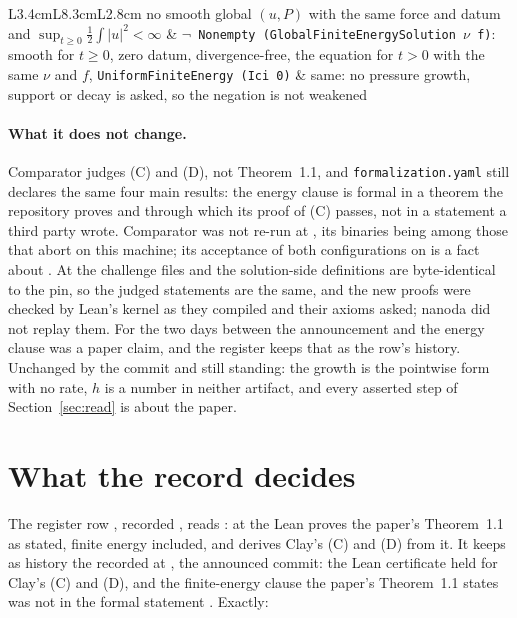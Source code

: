\documentclass[11pt]{article}
\newcommand{\lean}[1]{\texttt{#1}}
\begin{document}
\begin{table}[t]
\begin{tabular}{L{3.4cm}L{8.3cm}L{2.8cm}}
no smooth global $(u,P)$ with the same force and datum and $\sup_{t\ge0}\tfrac12\int|u|^2<\infty$ & \lean{$\neg$ Nonempty (GlobalFiniteEnergySolution $\nu$ f)}: smooth for $t\ge0$, zero datum, divergence-free, the equation for $t>0$ with the same $\nu$ and $f$, \lean{UniformFiniteEnergy (Ici 0)} & same: no pressure growth, support or decay is asked, so the negation is not weakened \\
\bottomrule\end{tabular}
\caption{The paper's Theorem~1.1 against \lean{breakdownStatement}, the statement
\lean{theorem\_1\_1} proves at \lean{\UpCommit}, one row per clause (\UpFidRows{} rows;
\UpFidSame{} read \emph{same}, \UpFidEquivalent{} \emph{equivalent}). Transcribed from the
record \cite{Records}.}\label{tab:thm11}
\end{table}

{\sloppy\paragraph{What it does not change.} Comparator judges (C) and (D), not Theorem~1.1, and
\lean{formalization.yaml} still declares the same four main results: the energy clause is
formal in a theorem the repository proves and through which its proof of (C) passes, not in a
statement a third party wrote. Comparator was not re-run at \lean{\UpCommit}, its binaries
being among those that abort on this machine; its acceptance of both configurations on
\BuildDate{} is a fact about \lean{\LeanCommit}. At \lean{\UpCommit} the challenge files and
the solution-side definitions are byte-identical to the pin, so the judged statements are the
same, and the new proofs were checked by Lean's kernel as they compiled and their axioms
asked; nanoda did not replay them. For the two days between the announcement and
\lean{\UpCommit} the energy clause was a paper claim, and the register keeps that as the row's
history. Unchanged by the commit and still standing: the growth is the pointwise form with no
rate, $h$ is a number in neither artifact, and every asserted step of Section~\ref{sec:read}
is about the paper.\par}

\section{What the record decides}\label{sec:decides}

The register row \lean{\LedgerId}, recorded \LedgerRecorded, reads \textsc{\LedgerVerdict}:
at \lean{\UpCommit} the Lean proves the paper's Theorem~1.1 as stated, finite energy
included, and derives Clay's (C) and (D) from it. It keeps as history the
\textsc{\LedgerPriorVerdict} recorded \LedgerPriorRecorded{} at \lean{\LedgerPriorAt}, the
announced commit: the Lean certificate held for Clay's (C) and (D), and the finite-energy
clause the paper's Theorem~1.1 states was not in the formal statement \cite{Records}. Exactly:
\end{document}
